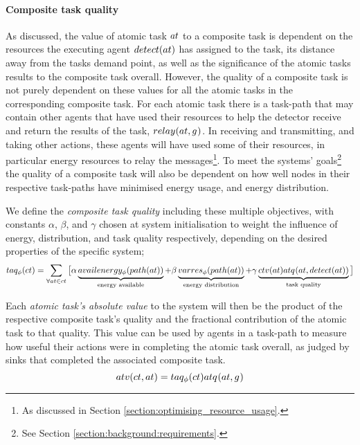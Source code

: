 \paragraph{Composite task quality}
\label{section:composite_task_quality}
As discussed, the value of atomic task $\varAtomicTask{}{}$ to a composite task is dependent on the resources the executing agent $\functionDetectorRole{}{}$ has assigned to the task, its distance away from the tasks demand point, as well as the significance of the atomic tasks results to the composite task overall. However, the quality of a composite task is not purely dependent on these values for all the atomic tasks in the corresponding composite task. For each atomic task there is a task-path that may contain other agents that have used their resources to help the detector receive and return the results of the task, $\functionRelayRole{}{}$. In receiving and transmitting, and taking other actions, these agents will have used some of their resources, in particular energy resources to relay the messages\footnote{As discussed in Section \ref{section:optimising_resource_usage}.}. To meet the systems' goals\footnote{See Section \ref{section:background:requirements}.}  the quality of a composite task will also be dependent on how well nodes in their respective task-paths have minimised energy usage, and energy distribution.  

We define the \textit{composite task quality} including these multiple objectives, with constants $\alpha$, $\beta$, and $\gamma$ chosen at system initialisation to weight the influence of energy, distribution, and task quality respectively, depending on the desired properties of the specific system; 
\begin{equation}
	\label{eq:ctv}
	\functionCompositeTaskQuality{}{} = 
	\sum\limits_{\forall \varAtomicTask{}{} \in \varCompositeTask{}{}}
	\big\lbrack
	\alpha\underbrace{\functionEnergyAvailable{\functionTaskArc{}{}}{}}_{\text{energy available}}
	+ \beta\underbrace{\functionEnergyVariability{\functionTaskArc{}{}}{}}_{\text{energy distribution}}
	+ 
	\gamma\underbrace{
		\functionComponentTaskValue{}{}
		\functionAtomicTaskQualitySignature{\varAtomicTask{}{}}{\functionDetectorRole{}{}}
	}_{\text{task quality}}
\big\rbrack
\end{equation}

Each \textit{atomic task's absolute value} to the system will then be the product of the respective composite task's quality and the fractional contribution of the atomic task to that quality. This value can be used by agents in a task-path to measure how useful their actions were in completing the atomic task overall, as judged by sinks that completed the associated composite task.
\begin{equation}
	\functionTaskAbsoluteValue{}{} = 
	\functionCompositeTaskQuality{}{}
	\functionAtomicTaskQualitySignature{}{}
\end{equation}


